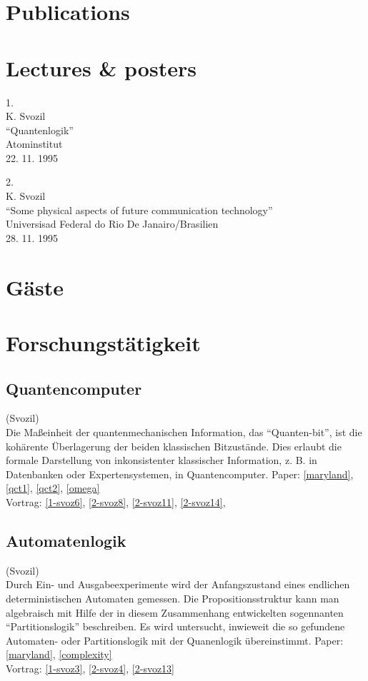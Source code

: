 

\section{Publications}

\section{Lectures \& posters}

1.\\
K. Svozil\\
``Quantenlogik''\\
Atominstitut\\
22. 11. 1995


2.\\
K. Svozil\\
``Some physical aspects of future communication technology''\\
Universisad Federal do Rio De Janairo/Brasilien \\
28. 11. 1995



\section{G\"aste}


\section{Forschungst\"atigkeit}

\subsection{Quantencomputer}
(Svozil)\\
Die Ma\ss einheit der quantenmechanischen Information, das
``Quanten-bit'', ist die koh\"arente \"Uberlagerung der beiden
klassischen Bitzust\"ande.
Dies erlaubt die formale Darstellung von inkonsistenter klassischer
Information, z. B. in Datenbanken oder Expertensystemen, in
Quantencomputer.
Paper:
\ref{maryland},
\ref{qct1},
\ref{qct2},
\ref{omega}
\\
Vortrag:
\ref{1-svoz6},
\ref{2-svoz8},
\ref{2-svoz11},
\ref{2-svoz14},
\\

\subsection{Automatenlogik}
(Svozil)\\
Durch Ein- und Ausgabeexperimente wird der Anfangszustand eines
endlichen deterministischen Automaten gemessen. Die Propositionsstruktur
kann man algebraisch mit Hilfe der in diesem Zusammenhang entwickelten
sogennanten
``Partitionslogik'' beschreiben.
Es wird untersucht, inwieweit die so gefundene Automaten- oder
Partitionslogik mit der Quanenlogik \"ubereinstimmt.
Paper:
\ref{maryland},
\ref{complexity}
\\
Vortrag:
\ref{1-svoz3},
\ref{2-svoz4},
\ref{2-svoz13}
\\



